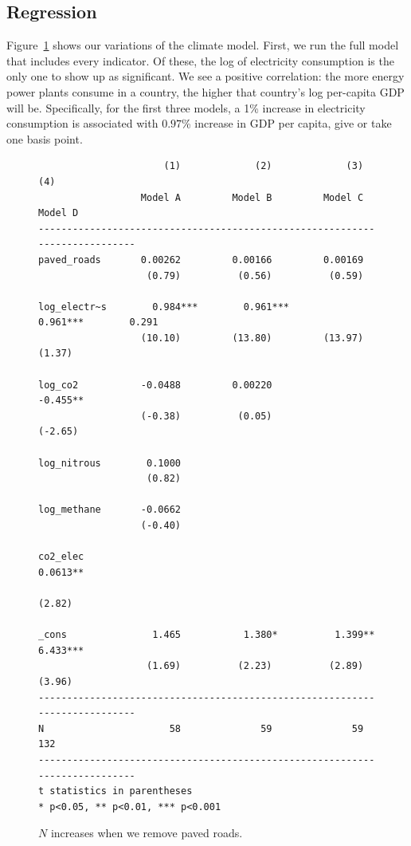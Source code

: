 \documentclass[11pt]{article}
\begin{document}
\subsection{Regression}
Figure~\ref{climate_model_regressions} shows our variations of the climate model.
First, we run the full model that includes every indicator.
Of these, the log of electricity consumption is the only one to show up as significant.
We see a positive correlation: the more energy power plants consume in a country, the higher that country's log per-capita GDP will be.
Specifically, for the first three models, a 1\% increase in electricity consumption is associated with $0.97$\% increase in GDP per capita, give or take one basis point.

\begin{figure}[!ht]
\begin{singlespace}
\begin{verbatim}
                      (1)             (2)             (3)             (4)   
                  Model A         Model B         Model C         Model D   
----------------------------------------------------------------------------
paved_roads       0.00262         0.00166         0.00169                   
                   (0.79)          (0.56)          (0.59)                   

log_electr~s        0.984***        0.961***        0.961***        0.291   
                  (10.10)         (13.80)         (13.97)          (1.37)   

log_co2           -0.0488         0.00220                          -0.455** 
                  (-0.38)          (0.05)                         (-2.65)   

log_nitrous        0.1000                                                   
                   (0.82)                                                   

log_methane       -0.0662                                                   
                  (-0.40)                                                   

co2_elec                                                           0.0613** 
                                                                   (2.82)   

_cons               1.465           1.380*          1.399**         6.433***
                   (1.69)          (2.23)          (2.89)          (3.96)   
----------------------------------------------------------------------------
N                      58              59              59             132   
----------------------------------------------------------------------------
t statistics in parentheses
* p<0.05, ** p<0.01, *** p<0.001
\end{verbatim}
\end{singlespace}
\caption{\label{climate_model_regressions}$N$ increases when we remove paved roads.}
\end{figure}
\end{document}
